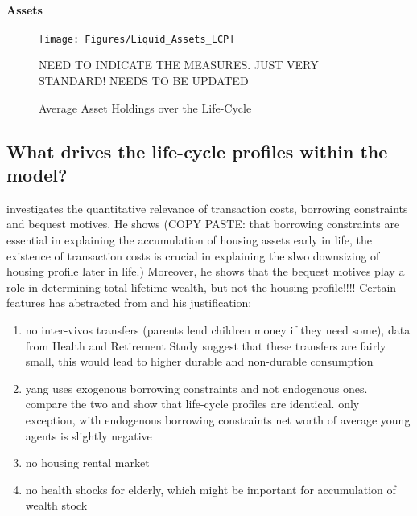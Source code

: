 \documentclass[a4paper,12pt]{article}
\begin{document}
\paragraph{Assets}

\begin{figure}
\caption{Average Asset Holdings over the Life-Cycle} 
\label{Asset_LCP}	%
\centering
\texttt{[image: Figures/Liquid\_Assets\_LCP]}  %

\begin{minipage}{0.8\linewidth}
\footnotesize{NEED TO INDICATE THE MEASURES. JUST VERY STANDARD! NEEDS TO BE UPDATED}
\end{minipage}

\end{figure}


\subsection{What drives the life-cycle profiles within the model?}

\cite{yang2009} investigates the quantitative relevance of transaction costs, borrowing constraints and bequest motives. 
He shows (COPY PASTE: that borrowing constraints are essential in explaining the accumulation of housing assets early in life, the existence of transaction costs is crucial in explaining the slwo downsizing of housing profile later in life.)
Moreover, he shows that the bequest motives play a role in determining total lifetime wealth, but not the housing profile!!!! 
Certain features \cite{yang2009} has abstracted from and his justification:
\begin{enumerate}
\item no inter-vivos transfers (parents lend children money if they need some), data from Health and Retirement Study suggest that these transfers are fairly small, this would lead to higher durable and non-durable consumption
\item yang uses exogenous borrowing constraints and not endogenous ones. \cite{FV&K2011} compare the two and show that life-cycle profiles are identical. only exception, with endogenous borrowing constraints net worth of average young agents is slightly negative 
\item no housing rental market 
\item no health shocks for elderly, which might be important for accumulation of wealth stock
\end{enumerate}
\end{document}
